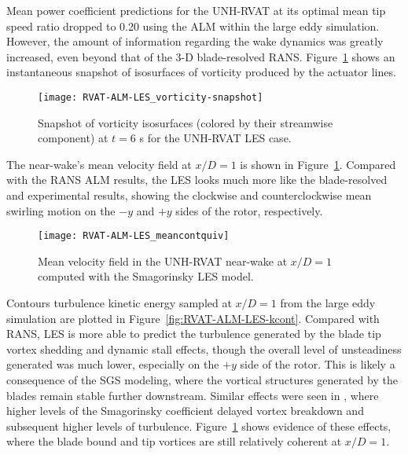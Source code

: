 Mean power coefficient predictions for the UNH-RVAT at its optimal mean tip
speed ratio dropped to 0.20 using the ALM within the large eddy simulation.
However, the amount of information regarding the wake dynamics was greatly
increased, even beyond that of the 3-D blade-resolved RANS.
Figure~\ref{RVAT-ALM-LES-vorticity} shows an instantaneous snapshot of
isosurfaces of vorticity produced by the actuator lines.

\begin{figure}
    \centering

    \texttt{[image: RVAT-ALM-LES\_vorticity-snapshot]}

    \caption{Snapshot of vorticity isosurfaces (colored by their streamwise
        component) at $t=6$ s for the UNH-RVAT LES case.}

    \label{RVAT-ALM-LES-vorticity}
\end{figure}

The near-wake's mean velocity field at $x/D=1$ is shown in
Figure~\ref{RVAT-ALM-LES-vorticity}. Compared with the RANS ALM results, the LES
looks much more like the blade-resolved and experimental results, showing the
clockwise and counterclockwise mean swirling motion on the $-y$ and $+y$ sides
of the rotor, respectively.

\begin{figure}
    \centering

    \texttt{[image: RVAT-ALM-LES\_meancontquiv]}

    \caption{Mean velocity field in the UNH-RVAT near-wake at $x/D=1$ computed
        with the Smagorinsky LES model.}

    \label{fig:RVAT-ALM-LES-meancontquiv}
\end{figure}

Contours turbulence kinetic energy sampled at $x/D=1$ from the large eddy
simulation are plotted in Figure~\ref{fig:RVAT-ALM-LES-kcont}. Compared with
RANS, LES is more able to predict the turbulence generated by the blade tip
vortex shedding and dynamic stall effects, though the overall level of
unsteadiness generated was much lower, especially on the $+y$ side of the rotor.
This is likely a consequence of the SGS modeling, where the vortical structures
generated by the blades remain stable further downstream. Similar effects were
seen in \cite{Martinez-Tossas2015a, Shamsoddin2014}, where higher levels of the
Smagorinsky coefficient delayed vortex breakdown and subsequent higher levels of
turbulence. Figure~\ref{RVAT-ALM-LES-vorticity} shows evidence of these effects,
where the blade bound and tip vortices are still relatively coherent at $x/D=1$.

